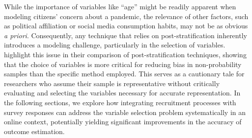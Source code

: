 While the importance of variables like ``age'' might be readily apparent when modeling citizens’ concern about a pandemic, the relevance of other factors, such as political affiliation or social media consumption habits, may not be as obvious \textit{a priori}. Consequently, any technique that relies on post-stratification inherently introduces a modeling challenge, particularly in the selection of variables. \citet{Mercer2018} highlight this issue in their comparison of post-stratification techniques, showing that the choice of variables is more critical for reducing bias in non-probability samples than the specific method employed. This serves as a cautionary tale for researchers who assume their sample is representative without critically evaluating and selecting the variables necessary for accurate representation. In the following sections, we explore how integrating recruitment processes with survey responses can address the variable selection problem systematically in an online context, potentially yielding significant improvements in the accuracy of outcome estimation.



